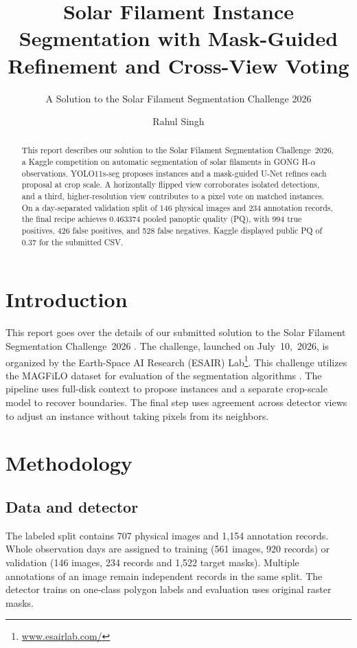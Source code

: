 \documentclass[sigconf]{acmart}
\begin{document}
\title{Solar Filament Instance Segmentation with Mask-Guided Refinement and Cross-View Voting}
\subtitle{A Solution to the Solar Filament Segmentation Challenge 2026}
\author{Rahul Singh}

\begin{abstract}
This report describes our solution to the Solar Filament Segmentation Challenge~2026, a Kaggle competition on automatic segmentation of solar filaments in GONG H-$\alpha$ observations. YOLO11s-seg proposes instances and a mask-guided U-Net refines each proposal at crop scale. A horizontally flipped view corroborates isolated detections, and a third, higher-resolution view contributes to a pixel vote on matched instances. On a day-separated validation split of 146 physical images and 234 annotation records, the final recipe achieves 0.463374 pooled panoptic quality (PQ), with 994 true positives, 426 false positives, and 528 false negatives. Kaggle displayed public PQ of 0.37 for the submitted CSV.
\end{abstract}
\maketitle

\section{Introduction}
This report goes over the details of our submitted solution to the Solar Filament Segmentation Challenge~2026 \cite{filament-segmentation-2026}. The challenge, launched on July~10,~2026, is organized by the Earth-Space AI Research (ESAIR) Lab\footnote{\href{https://www.esairlab.com/home}{www.esairlab.com/}}. This challenge utilizes the MAGFiLO dataset for evaluation of the segmentation algorithms \cite{ahmadzadeh2024dataset}. The pipeline uses full-disk context to propose instances and a separate crop-scale model to recover boundaries. The final step uses agreement across detector views to adjust an instance without taking pixels from its neighbors.

\section{Methodology}

\subsection{Data and detector}
The labeled split contains 707 physical images and 1,154 annotation records. Whole observation days are assigned to training (561 images, 920 records) or validation (146 images, 234 records and 1,522 target masks). Multiple annotations of an image remain independent records in the same split. The detector trains on one-class polygon labels and evaluation uses original raster masks.
\end{document}
